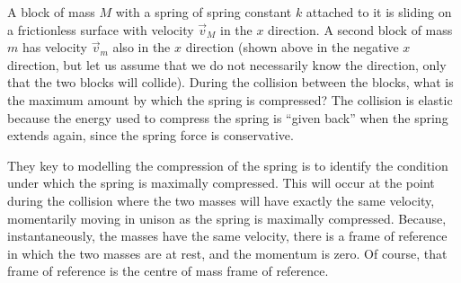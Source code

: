 \begin{example}{ A block of mass $M$ with a spring of spring constant $k$ attached to it is sliding on a frictionless surface with velocity $\vec v_M$ in the $x$ direction. A second block of mass $m$ has velocity $\vec v_m$ also in the $x$ direction (shown above in the negative $x$ direction, but let us assume that we do not necessarily know the direction, only  that the two blocks will collide). During the collision between the blocks, what is the maximum amount by which the spring is compressed?
}
The collision is elastic because the energy used to compress the spring is ``given back'' when the spring extends again, since the spring force is conservative. 

They key to modelling the compression of the spring is to identify the condition under which the spring is maximally compressed. This will occur at the point during the collision where the two masses will have exactly the same velocity, momentarily moving in unison as the spring is maximally compressed. Because, instantaneously, the masses have the same velocity, there is a frame of reference in which the two masses are at rest, and the momentum is zero. Of course, that frame of reference is the centre of mass frame of reference. 


\end{example}
